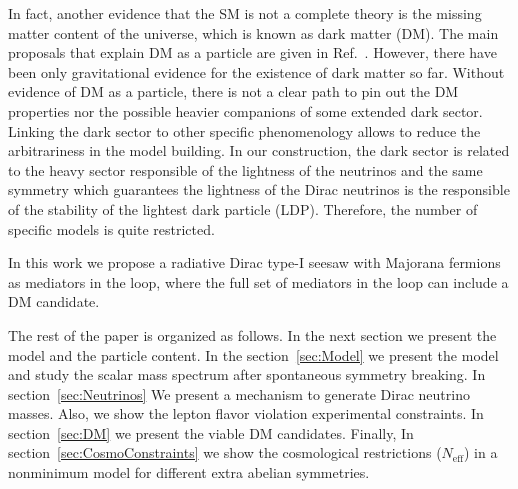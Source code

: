 \documentclass[12pt]{article}
\begin{document}
In fact, another evidence that the SM is not a complete theory is the
missing matter content of the universe, which is known as dark matter
(DM).
The main proposals that explain DM as a particle are given in
Ref.~\cite{Bertone:2004pz}.
However, there have been only gravitational evidence for the existence
of dark matter so far.
Without evidence of DM as a particle, there is not a clear path to pin
out the DM properties nor the possible heavier companions of some
extended dark sector. 
Linking the dark sector to other specific phenomenology allows to
reduce the arbitrariness in the model building.
In our construction, the dark sector is related to the heavy sector
responsible of the lightness of the neutrinos and the same symmetry
which guarantees the lightness of the Dirac neutrinos is the
responsible of the stability of the lightest dark particle (LDP).
Therefore, the number of specific models is quite restricted.

In this work we propose a radiative Dirac type-I seesaw with Majorana
fermions as mediators in the loop, where the full set of mediators in the
loop can include a DM candidate.

The rest of the paper is organized as follows. In the next section we present the model and the particle content. In the section~\ref{sec:Model} we present the model and study the scalar mass spectrum after spontaneous symmetry breaking. In section~\ref{sec:Neutrinos} We present a mechanism to generate Dirac neutrino masses. Also, we show the lepton flavor violation experimental  constraints. In section~\ref{sec:DM} we present the viable DM candidates. Finally, In section~\ref{sec:CosmoConstraints} we show the cosmological restrictions ($N_{\text{eff}}$) in a nonminimum model for different extra abelian symmetries.
\end{document}
